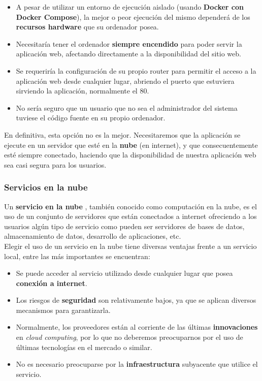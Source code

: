     \begin{itemize}
        \item A pesar de utilizar un entorno de ejecución aislado (usando \textbf{Docker
        con Docker Compose}), la mejor o peor ejecución del mismo dependerá de los
        \textbf{recursos hardware} que su ordenador posea.
        \item Necesitaría tener el ordenador \textbf{siempre encendido} para poder servir
        la aplicación web, afectando directamente a la disponibilidad del sitio web.
        \item Se requeriría la configuración de su propio router para permitir el acceso
        a la aplicación web desde cualquier lugar, abriendo el puerto que estuviera
        sirviendo la aplicación, normalmente el 80.
        \item No sería seguro que un usuario que no sea el administrador del sistema
        tuviese el código fuente en su propio ordenador.
    \end{itemize}

En definitiva, esta opción no es la mejor. Necesitaremos que la aplicación se ejecute en
un servidor que esté en la \textbf{nube} (en internet), y que consecuentemente esté
siempre conectado, haciendo que la disponibilidad de nuestra aplicación web sea casi
segura para los usuarios. \\

\subsubsection{Servicios en la nube}
Un \textbf{servicio en la nube} \cite{cloud-computing}, también conocido como computación
en la nube, es el uso de un conjunto de servidores que están conectados a internet
ofreciendo a los usuarios algún tipo de servicio como pueden ser servidores de bases de
datos, almacenamiento de datos, desarrollo de aplicaciones, etc. \\

Elegir el uso de un servicio en la nube tiene diversas ventajas frente a un servicio
local, entre las más importantes se encuentran:

    \begin{itemize}
        \item Se puede acceder al servicio utilizado desde cualquier lugar que posea
        \textbf{conexión a internet}.
        \item Los riesgos de \textbf{seguridad} son relativamente bajos, ya que se aplican
        diversos mecanismos para garantizarla.
        \item Normalmente, los proveedores están al corriente de las últimas
        \textbf{innovaciones} en \textit{cloud computing}, por lo que no deberemos
        preocuparnos por el uso de últimas tecnologías en el mercado o similar.
        \item No es necesario preocuparse por la \textbf{infraestructura} subyacente que
        utilice el servicio.
    \end{itemize}

